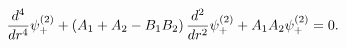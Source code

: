 \begin{equation}
\label{15}\frac{d^4}{dr^4}\psi _{+}^{(2)}+\left( A_1+A_2-B_1B_2\right) \frac{%
d^2}{dr^2}\psi _{+}^{(2)}+A_1A_2\psi _{+}^{(2)}=0. 
\end{equation}

